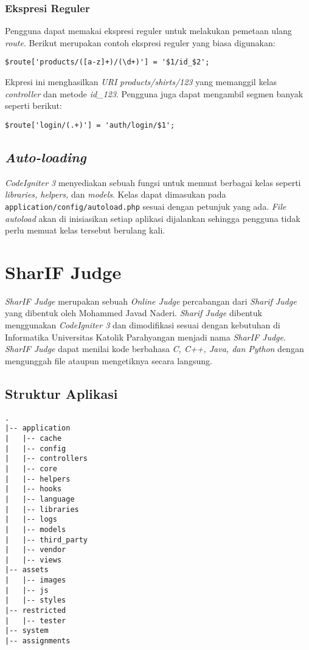 \subsubsection{Ekspresi Reguler}

Pengguna dapat memakai ekspresi reguler untuk melakukan pemetaan ulang \textit{route}. Berikut merupakan contoh ekspresi reguler yang biasa digunakan:

\begin{center}
\verb|$route['products/([a-z]+)/(\d+)'] = '$1/id_$2';|
\end{center}

Ekpresi ini menghasilkan \textit{URI} \textit{products/shirts/123} yang memanggil kelas \textit{controller} dan metode \textit{id\_123}. Pengguna juga dapat mengambil segmen banyak seperti berikut:
\begin{center}
\verb|$route['login/(.+)'] = 'auth/login/$1';|
\end{center}

\subsection{\textit{Auto-loading}}
\textit{CodeIgniter 3} menyediakan sebuah fungsi untuk memuat berbagai kelas seperti \textit{libraries, helpers,} dan \textit{models}. Kelas dapat dimasukan pada \texttt{application/config/autoload.php} sesuai dengan petunjuk yang ada. \textit{File autoload} akan di inisiasikan setiap aplikasi dijalankan sehingga pengguna tidak perlu memuat kelas tersebut berulang kali. 

\section{SharIF Judge\cite{sharif:23}}
\label{sec:judge}

\textit{SharIF Judge} merupakan sebuah \textit{Online Judge} percabangan dari \textit{Sharif Judge} yang dibentuk oleh Mohammed Javad Naderi. \textit{Sharif Judge} dibentuk menggunakan \textit{CodeIgniter 3} dan dimodifikasi sesuai dengan kebutuhan di Informatika Universitas Katolik Parahyangan menjadi nama \textit{SharIF Judge}. \textit{SharIF Judge} dapat menilai kode berbahasa \textit{C, C++, Java, dan Python} dengan mengunggah file ataupun mengetiknya secara langsung.

\subsection{Struktur Aplikasi}
\label{subsec:judgestructure}
\begin{lstlisting}
.
|-- application
|   |-- cache
|   |-- config
|   |-- controllers
|   |-- core
|   |-- helpers
|   |-- hooks
|   |-- language
|   |-- libraries
|   |-- logs
|   |-- models
|   |-- third_party
|   |-- vendor
|   |-- views
|-- assets
|   |-- images
|   |-- js
|   |-- styles
|-- restricted
|   |-- tester
|-- system
|-- assignments
\end{lstlisting}


